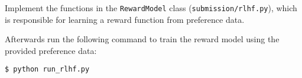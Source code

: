 \item {}

Implement the functions in the \texttt{RewardModel} class  (\texttt{submission/rlhf.py}), which is responsible for learning a reward function from preference data.

Afterwards run the following command to train the reward model using the provided preference data:

\begin{lstlisting}
$ python run_rlhf.py
\end{lstlisting}